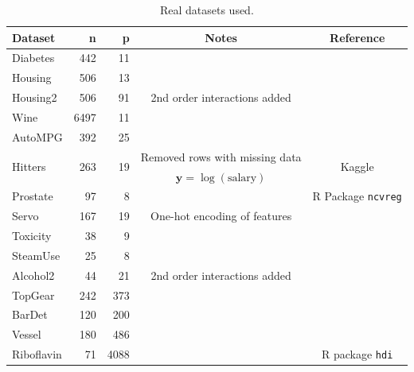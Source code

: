 \documentclass[mnsc,nonblindrev]{informs3} %
\begin{document}
\begin{table}[h]
\centering\footnotesize
\begin{tabular}{@{}l r r c c@{}} \toprule
Dataset & n & p & Notes & Reference\\
\midrule
Diabetes&442&11&&\cite{efron2004least}\\
Housing&506&13&&\cite{gomez2021mixed}\\
Housing2 & 506 & 91&2nd order interactions added &\cite{gomez2021mixed}\\ 
Wine & 6497 & 11&&\cite{misc_wine_quality_186} \\ 
AutoMPG & 392 & 25&&\cite{misc_auto_mpg_9}\\ 
\multirow{2}{*}{Hitters} & \multirow{2}{*}{263} & \multirow{2}{*}{19}&Removed rows with missing data& \multirow{2}{*}{Kaggle}\\ 
&&&$\bm{y}=\log(\text{salary})$&\\
Prostate & 97 & 8&&R Package \texttt{ncvreg} \\ 
Servo & 167 & 19&One-hot encoding of features &\cite{misc_servo_87}  \\ 
Toxicity & 38 & 9&&\cite{rousseeuw2009robustbase} \\ 
SteamUse & 25 & 8&&\cite{rousseeuw2009robustbase} \\ 
Alcohol2 & 44 & 21&2nd order interactions added&\cite{rousseeuw2009robustbase} \\ 
\midrule
TopGear & 242 & 373&&\cite{bottmer2022sparse}\\ 
BarDet & 120 & 200 &&\cite{ye2018sparsity}\\ 
Vessel & 180 & 486&&\cite{christidis2020split} \\ 
Riboflavin & 71 & 4088&&R package \texttt{hdi}\\
\bottomrule
\end{tabular}
\caption{Real datasets used.
}
\label{tab:datasets}
\end{table}
\end{document}

